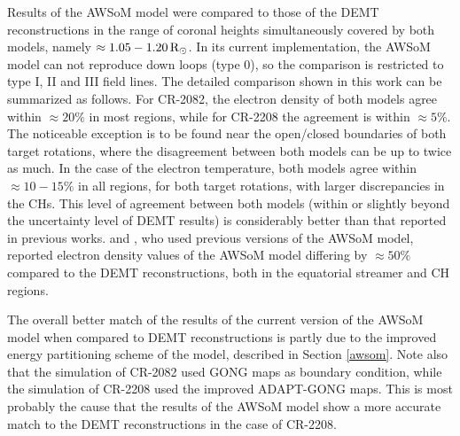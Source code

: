 \documentclass[namedreferences]{solarphysics}
\newcommand{\mrsun}{{\rm R_\odot}}
\begin{document}
\begin{article}
Results of the AWSoM model {were compared} to those of the DEMT reconstructions {in the range of coronal heights simultaneously covered by both models, namely $\approx 1.05-1.20\,\mrsun$.} In its current implementation, the AWSoM model can not reproduce down loops (type 0), so the comparison is restricted to type I, II and III field lines. The detailed comparison shown in this work can be summarized as follows. For CR-2082, the electron density of both models agree within $\approx 20\%$ {in most regions}, while for CR-2208 the agreement is within $\approx 5\%$. {The noticeable exception is to be found near the open/closed boundaries of both target rotations, where the disagreement between both models can be up to twice as much.} In the case of the electron temperature, both models agree within $\approx 10-15\%$ in all regions, for both target rotations{, with larger discrepancies in the CHs.} This level of agreement between both models {(within or slightly beyond the uncertainty level of DEMT results)} is considerably better than that reported in previous works. \citet{jin_2012} and \citet{oran_2015}{, who used previous versions of the AWSoM model,} reported electron density values of the AWSoM model {differing by $\approx 50\%$ compared to the DEMT reconstructions, both in the equatorial streamer and CH regions.} 

{The overall better match of the results of the current version of the AWSoM model when compared to DEMT reconstructions is partly due to the improved energy partitioning scheme of the model, described in Section \ref{awsom}. Note also that the simulation of CR-2082 used GONG maps as boundary condition, while the simulation of CR-2208 used the improved ADAPT-GONG maps. This is most probably the cause that the results of the AWSoM model show a more accurate match to the DEMT reconstructions in the case of CR-2208.}


\end{article}
\end{document}
